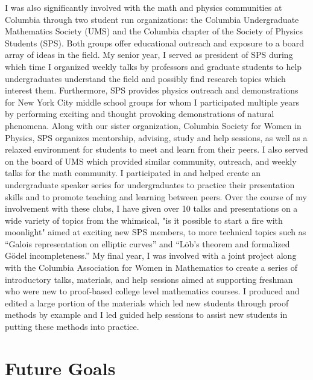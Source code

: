 \documentclass[11pt]{amsart}
\begin{document}
I was also significantly involved with the math and physics communities at Columbia through two student run organizations: the Columbia Undergraduate Mathematics Society (UMS) and the Columbia chapter of the Society of Physics Students (SPS). Both groups offer educational outreach and exposure to a board array of ideas in the field. My senior year, I served as president of SPS during which time I organized weekly talks by professors and graduate students to help undergraduates understand the field and possibly find research topics which interest them. Furthermore, SPS provides physics outreach and demonstrations for New York City middle school groups for whom I participated multiple years by performing exciting and thought provoking demonstrations of natural phenomena. Along with our sister organization, Columbia Society for Women in Physics, SPS organizes mentorship, advising, study and help sessions, as well as a relaxed environment for students to meet and learn from their peers. I also served on the board of UMS which provided similar community, outreach, and weekly talks for the math community. I participated in and helped create an undergraduate speaker series for undergraduates to practice their presentation skills and to promote teaching and learning between peers. Over the course of my involvement with these clubs, I have given over 10 talks and presentations on a wide variety of topics from the whimsical, "is it possible to start a fire with moonlight" aimed at exciting new SPS members, to more technical topics such as ``Galois representation on elliptic curves'' and ``L\"{o}b's theorem and formalized G\"{o}del incompleteness.'' My final year, I was involved with a joint project along with the Columbia Association for Women in Mathematics to create a series of introductory talks, materials, and help sessions aimed at supporting freshman who were new to proof-based college level mathematics courses. I produced and edited a large portion of the materials which led new students through proof methods by example and I led guided help sessions to assist new students in putting these methods into practice.

\section*{Future Goals}
\end{document}
